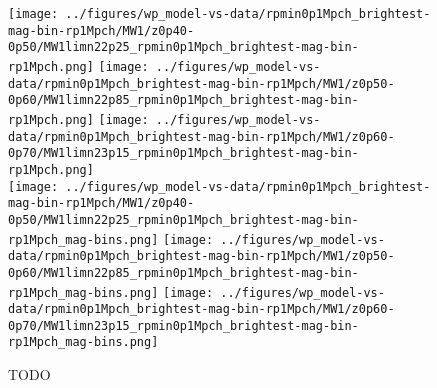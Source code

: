 \documentclass[twocolumn,apj,iop,tighten]{emulateapj2}
\begin{document}
\begin{figure*}
\centering
\texttt{[image: ../figures/wp\_model-vs-data/rpmin0p1Mpch\_brightest-mag-bin-rp1Mpch/MW1/z0p40-0p50/MW1limn22p25\_rpmin0p1Mpch\_brightest-mag-bin-rp1Mpch.png]}
\texttt{[image: ../figures/wp\_model-vs-data/rpmin0p1Mpch\_brightest-mag-bin-rp1Mpch/MW1/z0p50-0p60/MW1limn22p85\_rpmin0p1Mpch\_brightest-mag-bin-rp1Mpch.png]}
\texttt{[image: ../figures/wp\_model-vs-data/rpmin0p1Mpch\_brightest-mag-bin-rp1Mpch/MW1/z0p60-0p70/MW1limn23p15\_rpmin0p1Mpch\_brightest-mag-bin-rp1Mpch.png]}
\\
\texttt{[image: ../figures/wp\_model-vs-data/rpmin0p1Mpch\_brightest-mag-bin-rp1Mpch/MW1/z0p40-0p50/MW1limn22p25\_rpmin0p1Mpch\_brightest-mag-bin-rp1Mpch\_mag-bins.png]}
\texttt{[image: ../figures/wp\_model-vs-data/rpmin0p1Mpch\_brightest-mag-bin-rp1Mpch/MW1/z0p50-0p60/MW1limn22p85\_rpmin0p1Mpch\_brightest-mag-bin-rp1Mpch\_mag-bins.png]}
\texttt{[image: ../figures/wp\_model-vs-data/rpmin0p1Mpch\_brightest-mag-bin-rp1Mpch/MW1/z0p60-0p70/MW1limn23p15\_rpmin0p1Mpch\_brightest-mag-bin-rp1Mpch\_mag-bins.png]}
\caption{TODO
}
\label{fig:wp_all_ir}
\end{figure*}
\end{document}
